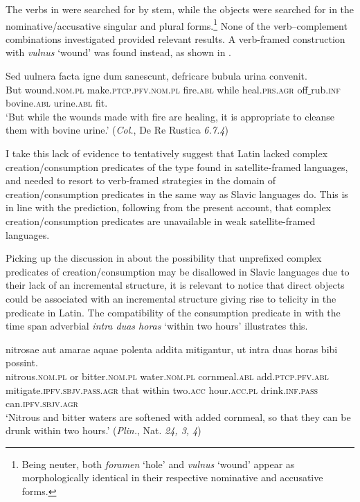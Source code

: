 \documentclass[output=paper,colorlinks,citecolor=brown]{langscibook}
\begin{document}
\noindent The verbs in  were searched for by stem, while the objects were searched for in the nominative/accusative singular and plural forms.\footnote{Being neuter, both \textit{foramen} `hole' and \textit{vulnus} `wound' appear as morphologically identical in their respective nominative and accusative forms.} None of the verb--complement combinations investigated provided relevant results. A verb-framed construction with \textit{vulnus} `wound' was found instead, as shown in .

\ea \label{vulneraigne} \gll Sed uulnera facta igne dum sanescunt, defricare bubula urina convenit.\\
But wound.\textsc{nom}.\textsc{pl} make.\textsc{ptcp}.\textsc{pfv}.\textsc{nom}.\textsc{pl} fire.\textsc{abl} while heal.\textsc{prs.agr} off$\_$rub.\textsc{inf} bovine.\textsc{abl} urine.\textsc{abl} fit.{\AGR}\\
\glt `But while the wounds made with fire are healing, it is appropriate to cleanse them with bovine urine.' \hfill (\textit{Col.}, De Re Rustica \textit{6.7.4}) \z

\noindent I take this lack of evidence to tentatively suggest that Latin lacked complex creation/consumption predicates of the type found in satellite-framed languages, and needed to resort to verb-framed strategies in the domain of creation/con\-sump\-tion predicates in the same way as Slavic languages do. This is in line with the prediction, following from the present account, that complex creation/con\-sump\-tion predicates are unavailable in weak satellite-framed languages.

Picking up the discussion in  about the possibility that unprefixed complex predicates of creation/consumption may be disallowed in Slavic languages due to their lack of an incremental structure, it is relevant to notice that direct objects could be associated with an incremental structure giving rise to telicity in the predicate in Latin. The compatibility of the consumption predicate in  with the time span adverbial \textit{intra duas horas} `within two hours' illustrates this.

\ea \gll [...] nitrosae aut amarae aquae polenta addita mitigantur, ut intra duas horas bibi possint.\\
{} nitrous.\textsc{nom}.\textsc{pl} or bitter.\textsc{nom}.\textsc{pl} water.\textsc{nom}.\textsc{pl} cornmeal.\textsc{abl} add.\textsc{ptcp}.\textsc{pfv}.\textsc{abl} mitigate.\textsc{ipfv}.\textsc{sbjv.pass}.\textsc{agr} that within two.\textsc{acc}\hspace{2em} hour.\textsc{acc}.\textsc{pl} drink.\textsc{inf.pass} can.\textsc{ipfv}.\textsc{sbjv}.\textsc{agr}\\ \label{Plinius}
\glt `Nitrous and bitter waters are softened with added cornmeal, so that they can be drunk within two hours.' \hfill (\textit{Plin.}, Nat. \textit{24, 3, 4}) \z
\end{document}
